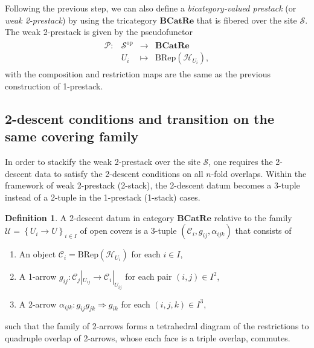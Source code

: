 \documentclass[reqno]{amsart}
\theoremstyle{definition}
\newtheorem{definition}[formula]{Definition}
\theoremstyle{remark}
\begin{document}
Following the previous step, we can also define a \textit{bicategory-valued prestack} (or \textit{weak 2-prestack}) by using the tricategory $\textbf{BCatRe}$ that is fibered over the site $\mathscr{S}$. The weak 2-prestack is given by the pseudofunctor
\begin{equation}
    \begin{split}
        \begin{array}{rccc}
\mathscr{P}: & \mathscr{S}^{\text{op}} & \longrightarrow & \textbf{BCatRe} \\
   & U_i & \longmapsto  & \text{BRep}(\mathscr{H}_{U_i}),
\end{array}
    \end{split}
\end{equation}
with the composition and restriction maps are the same as the previous construction of 1-prestack. 



\subsection{2-descent conditions and transition on the same covering family}
In order to stackify the weak 2-prestack over the site $\mathscr{S}$, one requires the 2-descent data to satisfy the 2-descent conditions on all $n$-fold overlaps. Within the framework of weak 2-prestack (2-stack), the 2-descent datum becomes a 3-tuple instead of a 2-tuple in the 1-prestack (1-stack) cases.

\begin{definition}
    A 2-descent datum in category $\textbf{BCatRe}$ relative to the family $\mathcal{U}=\left\{U_i\longrightarrow U\right\}_{i\in I}$ of open covers is a 3-tuple $\left(\mathcal{C}_i,g_{ij},\alpha_{ijk}\right)$ that consists of
    \begin{enumerate}
        \item An object $\mathcal{C}_i = \text{BRep}(\mathscr{H}_{U_i})$ for each $i\in I$,
        \item A 1-arrow $g_{ij}:\mathcal{C}_j|_{U_{ij}}\longrightarrow\mathcal{C}_i|_{U_{ij}}$ for each pair $(i,j)\in I^2$,
        \item A 2-arrow $\alpha_{ijk}:g_{ij} g_{jk} \Longrightarrow g_{ik}$ for each $(i,j,k)\in I^3$,
    \end{enumerate}
    such that the family of 2-arrows forms a tetrahedral diagram of the restrictions to quadruple overlap of 2-arrows, whose each face is a triple overlap, commutes.
\end{definition}
\end{document}
